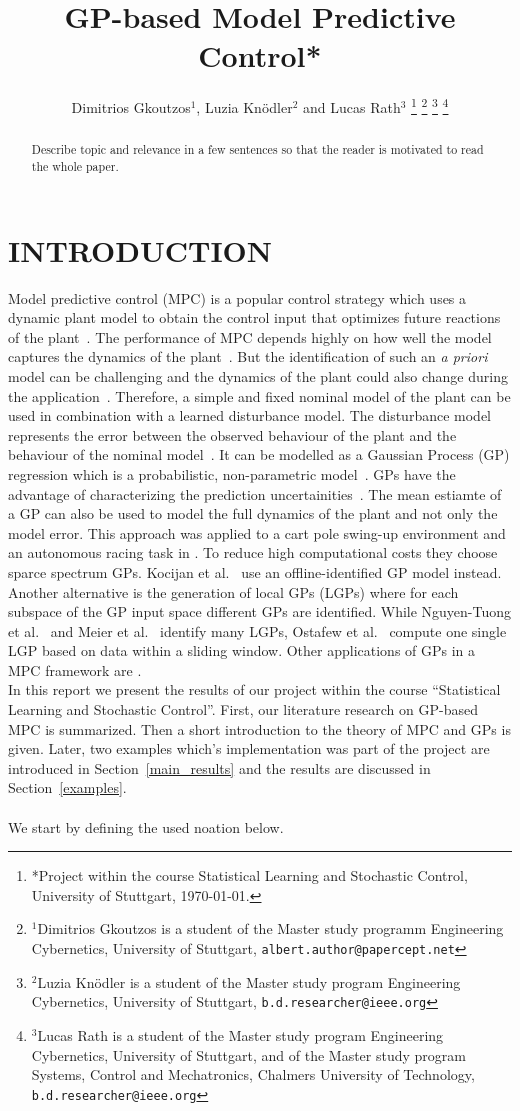 \documentclass[letterpaper, 10 pt, conference]{ieeeconf}  %
\title{\LARGE \bf
GP-based Model Predictive Control*
}
\author{Dimitrios Gkoutzos$^{1}$, Luzia Knödler$^{2}$ and Lucas Rath$^{3}$%
\thanks{*Project within the course Statistical Learning and Stochastic Control, University of Stuttgart, \today.}%
\thanks{$^{1}$Dimitrios Gkoutzos is a student of the Master study programm Engineering Cybernetics, University of Stuttgart,
        {\tt\small albert.author@papercept.net}}%
\thanks{$^{2}$Luzia Knödler is a student of the Master study program Engineering Cybernetics, University of Stuttgart,
        {\tt\small b.d.researcher@ieee.org}}%
\thanks{$^{3}$Lucas Rath is a student of the Master study program Engineering Cybernetics, University of Stuttgart, and of the Master study program Systems, Control and Mechatronics, Chalmers University of Technology,
        {\tt\small b.d.researcher@ieee.org}}%
}
\begin{document}
\maketitle
\thispagestyle{empty}
\pagestyle{empty}


\begin{abstract}

Describe topic and relevance in a few sentences so that the reader is motivated to
read the whole paper.

\end{abstract}


\section{INTRODUCTION}
Model predictive control (MPC) is a popular control strategy which uses a dynamic plant model to obtain the control input that optimizes future reactions of the plant~\cite{kocijan2004gaussian}. The performance of MPC depends highly on how well the model captures the dynamics of the plant~\cite{kabzan2019learning}. But the identification of such an \textit{a priori} model can be challenging and the dynamics of the plant could also change during the application~\cite{kabzan2019learning,ostafew2014learning}. Therefore, a simple and fixed nominal model of the plant can be used in combination with a learned disturbance model. The disturbance model represents the error between the observed behaviour of the plant and the behaviour of the nominal model~\cite{ostafew2014learning}. It can be modelled as a Gaussian Process (GP) regression which is a probabilistic, non-parametric model~\cite{kocijan2004gaussian}. GPs have the advantage of characterizing the prediction uncertainities~\cite{kocijan2004gaussian}. The mean estiamte of a GP can also be used to model the full dynamics of the plant and not only the model error. This approach was applied to a cart pole swing-up environment and an autonomous racing task in \cite{van2017online}. To reduce high computational costs they choose sparce spectrum GPs. Kocijan et al.~\cite{kocijan2004gaussian} use an offline-identified GP model instead. Another alternative is the generation of local GPs (LGPs) where for each subspace of the GP input space different GPs are identified. While Nguyen-Tuong et al.~\cite{nguyen2009local} and Meier et al.~\cite{meier2014efficient} identify many LGPs, Ostafew et al.~\cite{ostafew2014learning} compute one single LGP based on data within a sliding window. Other applications of GPs in a MPC framework are .
 \\
In this report we present the results of our project within the course ``Statistical Learning and Stochastic Control''. First, our literature research on GP-based MPC is summarized. Then a short introduction to the theory of MPC and GPs is given. Later, two examples which's  implementation was part of the project are introduced in Section~\ref{main_results} and the results are discussed in Section~\ref{examples}.\\
  \\
We start by defining the used noation below.
\end{document}
